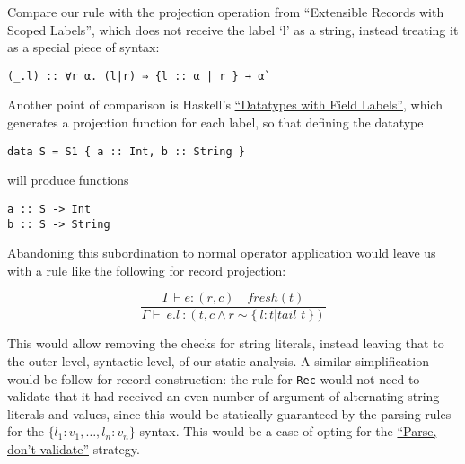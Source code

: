 \documentclass[11pt]{article}
\begin{document}
Compare our rule with the projection operation from ``Extensible Records
with Scoped Labels'', which does not receive the label `l' as a string,
instead treating it as a special piece of syntax:

\begin{verbatim}
(_.l) :: ∀r α. (l|r) ⇒ {l :: α | r } → α`
\end{verbatim}

Another point of comparison is Haskell's
\href{https://www.haskell.org/onlinereport/haskell2010/haskellch3.html\#x8-490003.15}{``Datatypes
with Field Labels''}, which generates a projection function for each
label, so that defining the datatype

\begin{verbatim}
data S = S1 { a :: Int, b :: String }
\end{verbatim}

will produce functions

\begin{verbatim}
a :: S -> Int
b :: S -> String
\end{verbatim}

Abandoning this subordination to normal operator application would leave
us with a rule like the following for record projection:

$$
\frac
{ \Gamma \vdash e \colon (r, c) \quad fresh(t) }
{ \Gamma \vdash \ e.l \ \colon (t, c \land r \sim \{ \ l \colon t | tail\_t \ \}) }
$$

This would allow removing the checks for string literals, instead
leaving that to the outer-level, syntactic level, of our static
analysis. A similar simplification would be follow for record
construction: the rule for \texttt{Rec} would not need to validate that it had
received an even number of argument of alternating string literals and
values, since this would be statically guaranteed by the parsing rules
for the \(\{ l_1 : v_1, \ldots, l_n : v_n \}\) syntax. This would be a
case of opting for the
\href{https://lexi-lambda.github.io/blog/2019/11/05/parse-don-t-validate/}{``Parse,
don't validate''} strategy.
\end{document}
